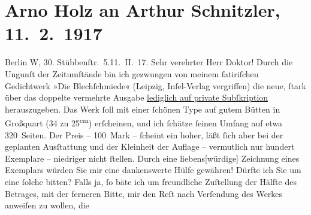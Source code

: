 

         \renewcommand{\erwaehnteInstitutionen}{Institutionen: Insel-Verlag, Petzschke {\kaufmannsund} Gretschel}
         \renewcommand{\erwaehnteOrte}{Orte: Berlin, Dresden, Leipzig, Stübbenstraße, Wien}
         \renewcommand{\erwaehnteWerke}{Werke: Die Blechschmiede}
               \section[Arno Holz an Arthur Schnitzler, 11. 2. 1917]{ Arno Holz an Arthur Schnitzler, 11. 2. 1917}\nopagebreak{}\rehead{ }\begin{ledgroupsized}[t]{13cm}\normalsize\beginnumbering \toendnotes[C]{\smallbreak\pagebreak[2]} 
\pstart
           \raggedleft{}{\pb}Berlin W, 30. Stübbenſtr. 5.\hspace*{1.5em}11. II. 17. \pend
           \pstart\center{}Sehr verehrter Herr Doktor!\pend\pstart
           Durch die Ungunſt der Zeitumſtände bin ich gezwungen von meinem ſatiriſchen
                    Gedichtwerk »Die Blechſchmiede« (Leipzig, Inſel-Verlag vergriffen) die neue, ſtark über das doppelte vermehrte
                    Ausgabe \uline{lediglich auf private Subſkription}
                    herauszugeben. Das Werk ſoll mit einer ſchönen Type auf gutem Bütten in
                    Großquart (34 zu 25\textsuperscript{cm}) erſcheinen, und ich ſchätze
                    ſeinen Umfang auf etwa 320 Seiten. Der Preis – 100 Mark – ſcheint ein hoher,
                    läßt ſich aber bei der geplanten Ausſtattung und der Kleinheit der Auflage –
                    vermutlich nur hundert Exemplare – niedriger nicht ſtellen. Durch eine
                        liebens{[}würdige{]} Zeichnung eines Exemplars würden Sie mir
                    eine dankenswerte Hülfe gewähren! Dürfte ich Sie um eine ſolche bitten? Falls
                    ja, ſo bäte ich um freundliche Zuſtellung der Hälfte des Betrages, mit der
                    ferneren Bitte, mir den Reſt nach Verſendung des Werkes anweiſen zu wollen, die

\end{ledgroupsized}
